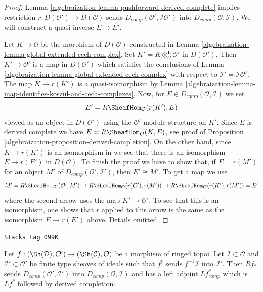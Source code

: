 \begin{proof}

Lemma \ref{algebraization-lemma-pushforward-derived-complete} implies
restriction $r : D(\mathcal{O}') \to D(\mathcal{O})$
sends $D_{comp}(\mathcal{O}', \mathcal{I}\mathcal{O}')$
into $D_{comp}(\mathcal{O}, \mathcal{I})$. We will construct a
quasi-inverse $E \mapsto E'$.

\medskip\noindent
Let $K \to \mathcal{O}$ be the morphism of $D(\mathcal{O})$
constructed in Lemma \ref{algebraization-lemma-global-extended-cech-complex}.
Set $K' = K \otimes_\mathcal{O}^\mathbf{L} \mathcal{O}'$ in $D(\mathcal{O}')$.
Then $K' \to \mathcal{O}'$ is a map in $D(\mathcal{O}')$ which
satisfies the conclusions of Lemma \ref{algebraization-lemma-global-extended-cech-complex}
with respect to $\mathcal{I}' = \mathcal{I}\mathcal{O}'$.
The map $K \to r(K')$ is a quasi-isomorphism by
Lemma \ref{algebraization-lemma-map-identifies-koszul-and-cech-complexes}.
Now, for $E \in D_{comp}(\mathcal{O}, \mathcal{I})$ we set
$$
E' = R\SheafHom_\mathcal{O}(r(K'), E)
$$
viewed as an object in $D(\mathcal{O}')$ using the $\mathcal{O}'$-module
structure on $K'$. Since $E$ is derived complete
we have $E = R\SheafHom_\mathcal{O}(K, E)$, see
proof of Proposition \ref{algebraization-proposition-derived-completion}.
On the other hand, since $K \to r(K')$ is an isomorphism in
we see that there is an isomorphism
$E \to r(E')$ in $D(\mathcal{O})$. To finish the proof we
have to show that, if $E = r(M')$ for an object $M'$ of
$D_{comp}(\mathcal{O}', \mathcal{I}')$, then
$E' \cong M'$. To get a map we use
$$
M' = R\SheafHom_{\mathcal{O}'}(\mathcal{O}', M') \to
R\SheafHom_\mathcal{O}(r(\mathcal{O}'), r(M')) \to
R\SheafHom_\mathcal{O}(r(K'), r(M')) = E'
$$
where the second arrow uses the map $K' \to \mathcal{O}'$.
To see that this is an isomorphism, one shows that $r$ applied
to this arrow is the same as the isomorphism $E \to r(E')$ above.
Details omitted.
\end{proof}

\begin{lemma}
\label{algebraization-lemma-pushforward-derived-complete-adjoint}
\href{https://stacks.math.columbia.edu/tag/099K}{\texttt{Stacks tag 099K}}

Let $f : (\Sh(\mathcal{D}), \mathcal{O}') \to (\Sh(\mathcal{C}), \mathcal{O})$
be a morphism of ringed topoi. Let $\mathcal{I} \subset \mathcal{O}$
and $\mathcal{I}' \subset \mathcal{O}'$
be finite type sheaves of ideals such that $f^\sharp$ sends
$f^{-1}\mathcal{I}$ into $\mathcal{I}'$.
Then $Rf_*$ sends $D_{comp}(\mathcal{O}', \mathcal{I}')$
into $D_{comp}(\mathcal{O}, \mathcal{I})$ and has a left adjoint
$Lf_{comp}^*$ which is $Lf^*$ followed by derived completion.
\end{lemma}

